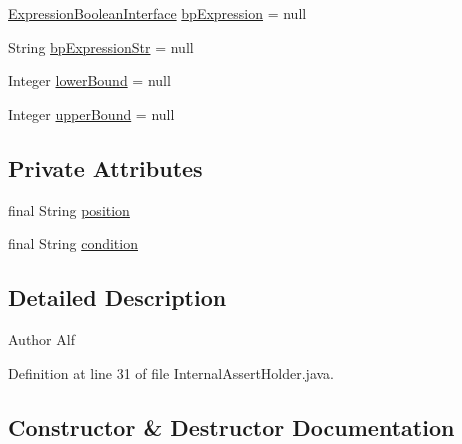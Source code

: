 \begin{DoxyCompactItemize}
\hyperlink{interfacegov_1_1nasa_1_1jpf_1_1inspector_1_1server_1_1expression_1_1_expression_boolean_interface}{Expression\+Boolean\+Interface} \hyperlink{classgov_1_1nasa_1_1jpf_1_1inspector_1_1server_1_1breakpoints_1_1_internal_breakpoint_holder_a67bbb21cd50adbff9c0e2a12ecd7ed66}{bp\+Expression} = null
\item 
String \hyperlink{classgov_1_1nasa_1_1jpf_1_1inspector_1_1server_1_1breakpoints_1_1_internal_breakpoint_holder_a97465a35e79135a7ecb6da72d004cc15}{bp\+Expression\+Str} = null
\item 
Integer \hyperlink{classgov_1_1nasa_1_1jpf_1_1inspector_1_1server_1_1breakpoints_1_1_internal_breakpoint_holder_ae884e78a734be2e3d219243eb2b3aa12}{lower\+Bound} = null
\item 
Integer \hyperlink{classgov_1_1nasa_1_1jpf_1_1inspector_1_1server_1_1breakpoints_1_1_internal_breakpoint_holder_a312bda6a263d1daad8dc3fd937d96169}{upper\+Bound} = null
\end{DoxyCompactItemize}
\subsection*{Private Attributes}
\begin{DoxyCompactItemize}
\item 
final String \hyperlink{classgov_1_1nasa_1_1jpf_1_1inspector_1_1server_1_1breakpoints_1_1_internal_assert_holder_ab517a8591e91531f34cfc9b4fe758c41}{position}
\item 
final String \hyperlink{classgov_1_1nasa_1_1jpf_1_1inspector_1_1server_1_1breakpoints_1_1_internal_assert_holder_a18995a52b515cf975da374c2fc7af651}{condition}
\end{DoxyCompactItemize}


\subsection{Detailed Description}
\begin{DoxyAuthor}{Author}
Alf 
\end{DoxyAuthor}


Definition at line 31 of file Internal\+Assert\+Holder.\+java.



\subsection{Constructor \& Destructor Documentation}
